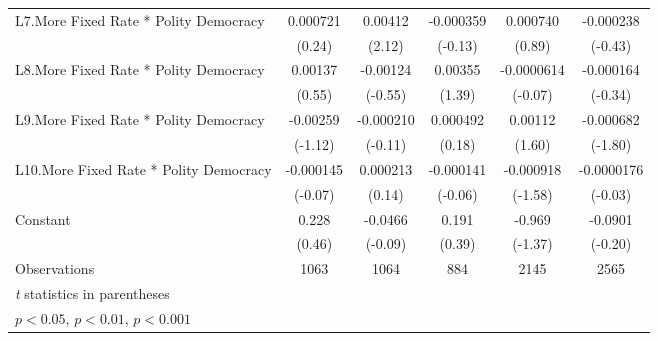 {\begin{longtable}{l*{5}{c}}
\addlinespace
L7.More Fixed Rate * Polity Democracy& 0.000721         &  0.00412\sym{*}  &-0.000359         & 0.000740         &-0.000238         \\
                &   (0.24)         &   (2.12)         &  (-0.13)         &   (0.89)         &  (-0.43)         \\
\addlinespace
L8.More Fixed Rate * Polity Democracy&  0.00137         & -0.00124         &  0.00355         &-0.0000614         &-0.000164         \\
                &   (0.55)         &  (-0.55)         &   (1.39)         &  (-0.07)         &  (-0.34)         \\
\addlinespace
L9.More Fixed Rate * Polity Democracy& -0.00259         &-0.000210         & 0.000492         &  0.00112         &-0.000682         \\
                &  (-1.12)         &  (-0.11)         &   (0.18)         &   (1.60)         &  (-1.80)         \\
\addlinespace
L10.More Fixed Rate * Polity Democracy&-0.000145         & 0.000213         &-0.000141         &-0.000918         &-0.0000176         \\
                &  (-0.07)         &   (0.14)         &  (-0.06)         &  (-1.58)         &  (-0.03)         \\
\addlinespace
Constant        &    0.228         &  -0.0466         &    0.191         &   -0.969         &  -0.0901         \\
                &   (0.46)         &  (-0.09)         &   (0.39)         &  (-1.37)         &  (-0.20)         \\
\midrule
Observations    &     1063         &     1064         &      884         &     2145         &     2565         \\
\bottomrule
\multicolumn{6}{l}{\footnotesize \textit{t} statistics in parentheses}\\
\multicolumn{6}{l}{\footnotesize \sym{*} \(p<0.05\), \sym{**} \(p<0.01\), \sym{***} \(p<0.001\)}\\
\end{longtable}
}
